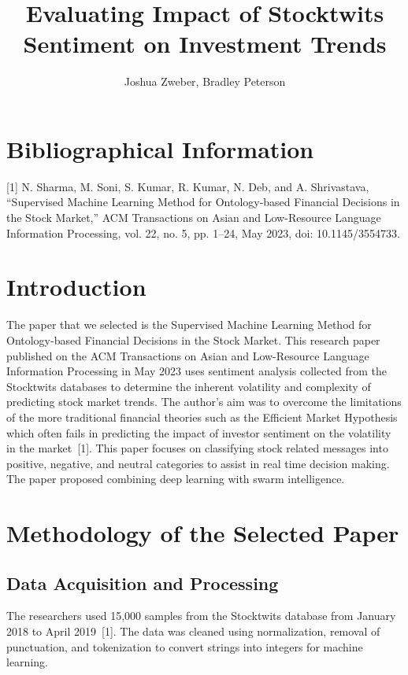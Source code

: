 \documentclass[12pt, onecolumn, letterpaper]{IEEEtran}
\title{Evaluating Impact of Stocktwits Sentiment on Investment Trends}
\author{Joshua Zweber, Bradley Peterson}
\begin{document}
\maketitle

\section*{Bibliographical Information}

[1] N. Sharma, M. Soni, S. Kumar, R. Kumar, N. Deb, and A. Shrivastava, “Supervised Machine Learning Method for Ontology-based Financial Decisions in the Stock Market,” ACM Transactions on Asian and Low-Resource Language Information Processing, vol. 22, no. 5, pp. 1–24, May 2023, doi: 10.1145/3554733.

\section{Introduction}

The paper that we selected is the Supervised Machine Learning Method for Ontology-based Financial Decisions in the Stock Market.
This research paper published on the ACM Transactions on Asian and Low-Resource Language Information Processing in May 2023 uses sentiment analysis collected from the Stocktwits databases to determine the inherent volatility and complexity of predicting stock market trends.
The author’s aim was to overcome the limitations of the more traditional financial theories such as the Efficient Market Hypothesis which often fails in predicting the impact of investor sentiment on the volatility in the market~[1].
This paper focuses on classifying stock related messages into positive, negative, and neutral categories to assist in real time decision making.
The paper proposed combining deep learning with swarm intelligence.

\section{Methodology of the Selected Paper}

\subsection{Data Acquisition and Processing}
The researchers used 15,000 samples from the Stocktwits database from January 2018 to April 2019~[1].
The data was cleaned using normalization, removal of punctuation, and tokenization to convert strings into integers for machine learning.
\end{document}
